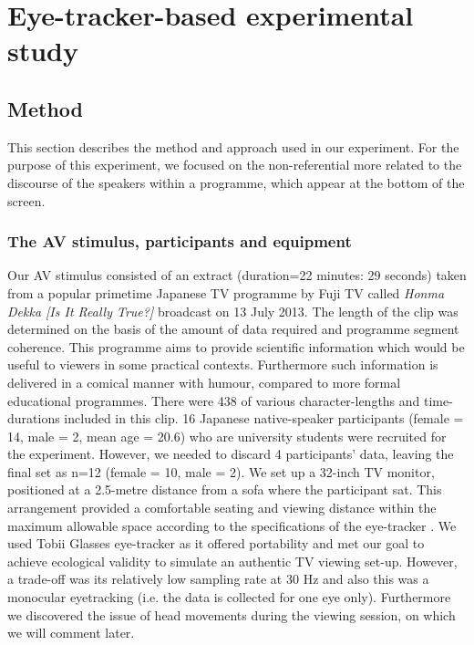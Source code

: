 \documentclass[output=paper]{langsci/langscibook}
\begin{document}
\section{Eye-tracker-based experimental study}

\subsection{Method}

This section describes the method and approach used in our experiment. For the purpose of this experiment, we focused on the non-referential  more related to the discourse of the speakers within a programme, which appear at the bottom of the screen.  

\subsubsection{The AV stimulus, participants and equipment}

Our AV stimulus consisted of an extract (duration=22 minutes: 29 seconds) taken from a popular primetime Japanese TV programme by Fuji TV called \textit{Honma Dekka [Is It Really True?]} broadcast on 13 July 2013. The length of the clip was determined on the basis of the amount of  data required and programme segment coherence.  This programme aims to provide scientific information which would be useful to viewers in some practical contexts. Furthermore such information is delivered in a comical manner with humour, compared to more formal educational programmes. There were 438  of various character-lengths and time-durations included in this clip. 16 Japanese native-speaker participants (female = 14, male = 2, mean age = 20.6) who are university students were recruited for the experiment. However, we needed to discard 4 participants' data, leaving the final set as n=12 (female = 10, male = 2). We set up a 32-inch TV monitor, positioned at a 2.5-metre distance from a sofa where the participant sat. This arrangement provided a comfortable seating and viewing distance within the maximum allowable space according to the specifications of the eye-tracker \citep{Tobii2012}. We used Tobii Glasses eye-tracker as it offered portability and met our goal to achieve ecological validity to simulate an authentic TV viewing set-up. However, a trade-off was its relatively low sampling rate at 30 Hz and also this was a monocular eyetracking (i.e. the data is collected for one eye only).  Furthermore we discovered the issue of head movements during the viewing session, on which we will comment later.  
\end{document}
